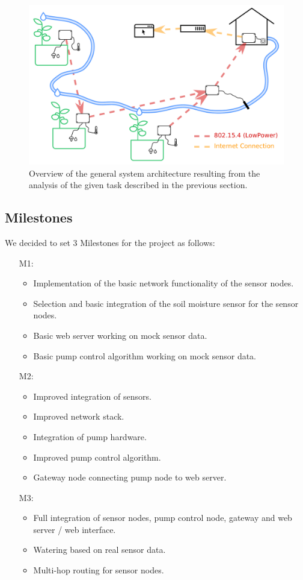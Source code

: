 \documentclass[11pt,paper=a4,parskip=half]{scrartcl}
\begin{document}
  \begin{figure}[h]
    \centering
    \includegraphics[scale=0.4]{schema}
	  \caption{Overview of the general system architecture resulting from
	  the analysis of the given task described in the previous section.}
    \label{fig:schema}
  \end{figure}

\subsection{Milestones}
  We decided to set 3 Milestones for the project as follows:

  \begin{itemize}
    \item[M1:]
      \begin{itemize}
	\item Implementation of the basic network functionality of the sensor
		nodes.
	\item Selection and basic integration of the soil moisture sensor for
		the sensor nodes.
	\item Basic web server working on mock sensor data.
	\item Basic pump control algorithm working on mock sensor data.
      \end{itemize}
    \item[M2:]
      \begin{itemize}
	\item Improved integration of sensors.
	\item Improved network stack.
	\item Integration of pump hardware.
	\item Improved pump control algorithm.
	\item Gateway node connecting pump node to web server.
      \end{itemize}
    \item[M3:]
      \begin{itemize}
	\item Full integration of sensor nodes, pump control node, gateway and
		web server / web interface.
	\item Watering based on real sensor data.
	\item Multi-hop routing for sensor nodes.
      \end{itemize}
  \end{itemize}
\end{document}
